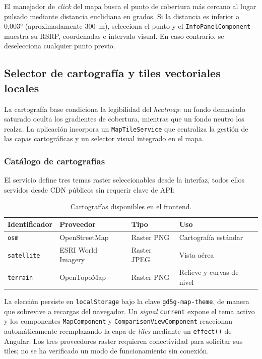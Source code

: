 El manejador de \textit{click} del mapa busca el punto de cobertura más cercano
al lugar pulsado mediante distancia euclidiana en grados. Si la distancia es inferior
a 0,003° (aproximadamente 300~m), selecciona el punto y el \texttt{InfoPanelComponent}
muestra su RSRP, coordenadas e intervalo visual. En caso contrario, se
deselecciona cualquier punto previo.

\subsection{Selector de cartografía y tiles vectoriales locales}
\label{sec:frontend_tile_themes}

La cartografía base condiciona la legibilidad del \textit{heatmap}: un fondo demasiado
saturado oculta los gradientes de cobertura, mientras que un fondo neutro los realza.
La aplicación incorpora un \texttt{MapTileService} que centraliza la gestión de las capas
cartográficas y un selector visual integrado en el mapa.

\subsubsection{Catálogo de cartografías}

El servicio define tres temas raster seleccionables desde la interfaz, todos ellos
servidos desde CDN públicos sin requerir clave de API:

\begin{table}[h!]
\centering
\caption{Cartografías disponibles en el frontend.}
\label{tab:cartografias}
\small
\begin{tabular}{|l|l|l|l|}
\hline
\textbf{Identificador} & \textbf{Proveedor} & \textbf{Tipo} & \textbf{Uso} \\
\hline
\texttt{osm}          & OpenStreetMap                & Raster PNG    & Cartografía estándar \\
\texttt{satellite}    & ESRI World Imagery           & Raster JPEG   & Vista aérea \\
\texttt{terrain}      & OpenTopoMap                  & Raster PNG    & Relieve y curvas de nivel \\
\hline
\end{tabular}
\end{table}

La elección persiste en \texttt{localStorage} bajo la clave \texttt{gd5g-map-theme},
de manera que sobrevive a recargas del navegador. Un \textit{signal} \texttt{current}
expone el tema activo y los componentes \texttt{MapComponent} y \texttt{ComparisonViewComponent}
reaccionan automáticamente reemplazando la capa de \textit{tiles} mediante un
\texttt{effect()} de Angular. Los tres proveedores raster requieren conectividad para
solicitar sus tiles; no se ha verificado un modo de funcionamiento sin conexión.

